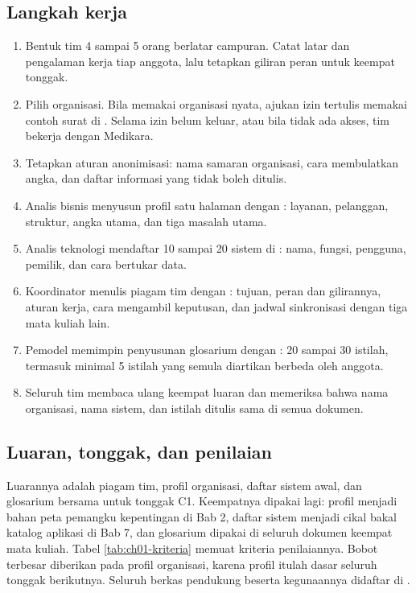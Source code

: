 \subsection*{Langkah kerja}

\begin{enumerate}
  \item Bentuk tim 4 sampai 5 orang berlatar campuran. Catat latar dan
        pengalaman kerja tiap anggota, lalu tetapkan giliran peran untuk
        keempat tonggak.
  \item Pilih organisasi. Bila memakai organisasi nyata, ajukan izin tertulis
        memakai contoh surat di
        . Selama izin
        belum keluar, atau bila tidak ada akses, tim bekerja dengan Medikara.
  \item Tetapkan aturan anonimisasi: nama samaran organisasi, cara membulatkan
        angka, dan daftar informasi yang tidak boleh ditulis.
  \item Analis bisnis menyusun profil satu halaman dengan
        : layanan,
        pelanggan, struktur, angka utama, dan tiga masalah utama.
  \item Analis teknologi mendaftar 10 sampai 20 sistem di
        : nama, fungsi,
        pengguna, pemilik, dan cara bertukar data.
  \item Koordinator menulis piagam tim dengan
        : tujuan, peran dan
        gilirannya, aturan kerja, cara mengambil keputusan, dan jadwal
        sinkronisasi dengan tiga mata kuliah lain.
  \item Pemodel memimpin penyusunan glosarium dengan
        : 20 sampai 30 istilah,
        termasuk minimal 5 istilah yang semula diartikan berbeda oleh anggota.
  \item Seluruh tim membaca ulang keempat luaran dan memeriksa bahwa nama
        organisasi, nama sistem, dan istilah ditulis sama di semua dokumen.
\end{enumerate}

\subsection*{Luaran, tonggak, dan penilaian}

Luarannya adalah piagam tim, profil organisasi, daftar sistem awal, dan
glosarium bersama untuk tonggak C1. Keempatnya dipakai lagi: profil menjadi
bahan peta pemangku kepentingan di Bab 2, daftar sistem menjadi cikal bakal
katalog aplikasi di Bab 7, dan glosarium dipakai di seluruh dokumen keempat
mata kuliah. Tabel \ref{tab:ch01-kriteria} memuat kriteria penilaiannya.
Bobot terbesar diberikan pada profil organisasi, karena profil itulah dasar
seluruh tonggak berikutnya. Seluruh berkas pendukung beserta kegunaannya
didaftar di .

